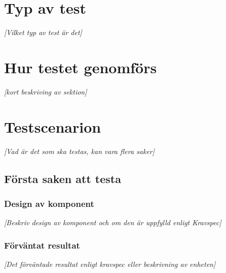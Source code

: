 \documentclass[a4paper,10pt]{article}
\begin{document}
\section{Typ av test}
\emph{[Vilket typ av test är det]}
\section{Hur testet genomförs}
\emph{[kort beskriving av sektion]}
\section{Testscenarion}
\emph{[Vad är det som ska testas, kan vara flera saker]}
\subsection{Första saken att testa}
\subsubsection{Design av komponent}
\emph{[Beskriv design av komponent och om den är uppfylld enligt Kravspec]}
\subsubsection{Förväntat resultat}
\emph{[Det förväntade resultat enligt kravspec eller beskrivning av enheten]}
\end{document}
